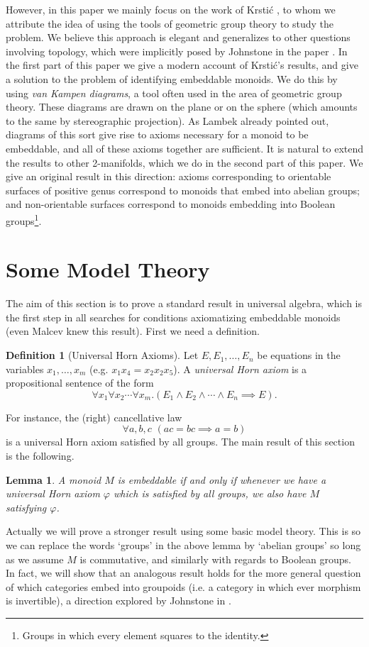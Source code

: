 \documentclass{article}
\theoremstyle{plain}
\newtheorem{lem}[thm]{Lemma}
\theoremstyle{definition}
\newtheorem{defn}[thm]{Definition}
\begin{document}
	However, in this paper we mainly focus on the work of Krsti\'c \cite{krstic1985embedding}, to whom we attribute the idea of using the tools of geometric group theory to study the problem. We believe this approach is elegant and generalizes to other questions involving topology, which were implicitly posed by Johnstone in the paper \cite{johnstone2008embedding}. In the first part of this paper we give a modern account of Krsti\'c's results, and give a solution to the problem of identifying embeddable monoids. We do this by using \emph{van Kampen diagrams}, a tool often used in the area of geometric group theory. These diagrams are drawn on the plane or on the sphere (which amounts to the same by stereographic projection). As Lambek already pointed out, diagrams of this sort give rise to axioms necessary for a monoid to be embeddable, and all of these axioms together are sufficient. It is natural to extend the results to other 2-manifolds, which we do in the second part of this paper. We give an original result in this direction: axioms corresponding to orientable surfaces of positive genus correspond to monoids that embed into abelian groups; and non-orientable surfaces correspond to monoids embedding into Boolean groups\footnote{Groups in which every element squares to the identity.}.
	
	\section{Some Model Theory}
	The aim of this section is to prove a standard result in universal algebra, which is the first step in all searches for conditions axiomatizing embeddable monoids (even Malcev knew this result). First we need a definition.
	\begin{defn}[Universal Horn Axioms]
		Let $E, E_1,\ldots, E_n$ be equations in the variables $x_1,\ldots, x_m$ (e.g. $x_1x_4 = x_2x_2x_5$). A \emph{universal Horn axiom} is a propositional sentence of the form
		\[
			\forall x_1 \forall x_2 \cdots \forall x_m. (E_1\wedge E_2 \wedge \cdots \wedge E_n \implies E).
		\]
	\end{defn} 
	
	For instance, the (right) cancellative law
	\[
		\forall a,b,c\,\,(ac = bc \implies a = b)
	\] 
	is a universal Horn axiom satisfied by all groups. The main result of this section is the following.
	\begin{lem}
		A monoid $M$ is embeddable if and only if whenever we have a universal Horn axiom $\varphi$ which is satisfied by all groups, we also have $M$ satisfying $\varphi$.
	\end{lem}
	Actually we will prove a stronger result using some basic model theory. This is so we can replace the words `groups' in the above lemma by `abelian groups' so long as we assume $M$ is commutative, and similarly with regards to Boolean groups. In fact, we will show that an analogous result holds for the more general question of which categories embed into groupoids (i.e. a category in which ever morphism is invertible), a direction explored by Johnstone in \cite{johnstone2008embedding}. 
	
\end{document}
